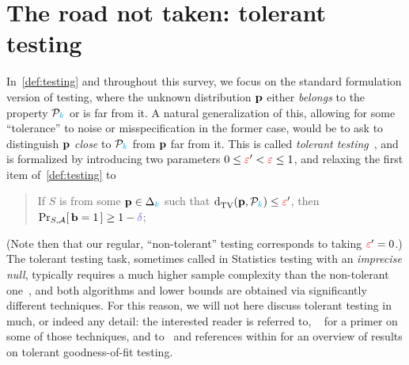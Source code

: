 \section{The road not taken: tolerant testing}
In~\cref{def:testing} and throughout this survey, we focus on the standard formulation version of testing, where the unknown distribution $\mathbf{p}$ either \emph{belongs} to the property $\mathcal{P}_{\textcolor{cyan}{k}}$ or is far from it. A natural generalization of this, allowing for some ``tolerance'' to noise or misspecification in the former case, would be to ask to distinguish $\mathbf{p}$ \emph{close} to $\mathcal{P}_{\textcolor{cyan}{k}}$ from $\mathbf{p}$ far from it. This is called \emph{tolerant testing}~\cite{ParnasRR06}, and is formalized by introducing two parameters $0\leq \textcolor{red}{\varepsilon}' < \textcolor{red}{\varepsilon} \leq 1$, and relaxing the first item of~\cref{def:testing} to 
\begin{quote}
If $S$ is \iid from some $\mathbf{p}\in\Delta_{{\textcolor{cyan}{k}}}$ such that $\totalvardist{\p}{\property_\ab} \leq \dst'$, then $\probaDistrOf{S,\Algo}{\mathbf{b}=\accept} \geq 1-\errprob$;
\end{quote}
(Note then that our regular, ``non-tolerant'' testing corresponds to taking $\textcolor{red}{\varepsilon}'=0$.) The tolerant testing task, sometimes called in Statistics testing with an \emph{imprecise null}, typically requires a much higher sample complexity than the non-tolerant one~\citep{VV:11:stoc}, and both algorithms and lower bounds are obtained via significantly different techniques. For this reason, we will not here discuss tolerant testing in much, or indeed any detail: the interested reader is referred to, \eg~\citet{WuY20} for a primer on some of those techniques, and to~\citet{CanonneJKL21} and references within for an overview of results on tolerant goodness-of-fit testing.
